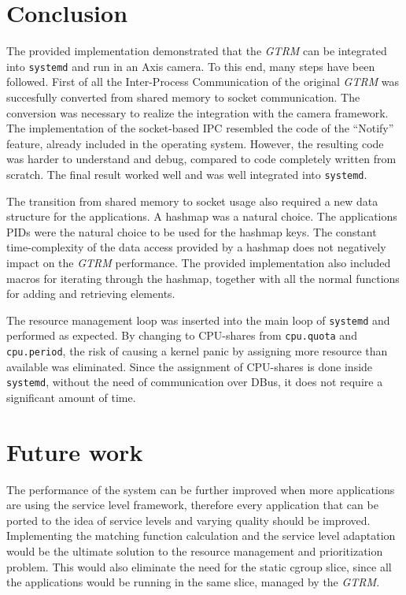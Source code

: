 \documentclass[nobiblatex]{LTHthesis}
\begin{document}
\section{Conclusion}

The provided implementation demonstrated that the \emph{GTRM} can be integrated into
\texttt{systemd} and run in an Axis camera. To this end, many steps have been
followed. First of all the Inter-Process Communication of the original \emph{GTRM}
was succesfully converted from shared memory to socket communication. The
conversion was necessary to realize the integration with the camera
framework. The implementation of the socket-based IPC resembled the
code of the ``Notify'' feature, already included in the operating system.
However, the resulting code was harder to understand and debug, compared to
code completely written from scratch. The final result worked well and was
well integrated into \texttt{systemd}.

The transition from shared memory to socket usage also required a new data
structure for the applications. A hashmap was a natural choice. The
applications PIDs were the natural choice to be used for the hashmap keys.
The constant time-complexity of the data access provided by a hashmap does not
negatively impact on the \emph{GTRM} performance. The provided implementation also
included macros for iterating through the hashmap, together with all the
normal functions for adding and retrieving elements. 

The resource management loop was inserted into the main loop of 
\texttt{systemd} and performed as expected. By changing to CPU-shares from
\texttt{cpu.quota} and \texttt{cpu.period}, the risk of causing a kernel 
panic by assigning more resource than available was eliminated. Since the
assignment of CPU-shares is done inside \texttt{systemd}, without the need of
communication over DBus, it does not require a significant amount of time.



\section{Future work}
 The performance of the system can be further improved when more applications are using the
service level framework, therefore every application that can be ported to
the idea of service levels and varying quality should be improved.
Implementing the matching function calculation and the service level
adaptation would be the ultimate solution to the resource management and
prioritization problem. This would also eliminate the need for the static
cgroup slice, since all the applications would be running in the same slice,
managed by the \emph{GTRM}.
\end{document}

